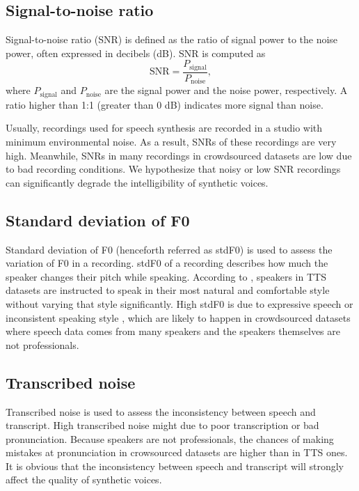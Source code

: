 \documentclass[12pt]{article}
\begin{document}
\subsection{Signal-to-noise ratio}
Signal-to-noise ratio (SNR) is defined as the ratio of signal power to the noise power, often expressed in decibels (dB). SNR is computed as
\begin{equation}\label{exp_SNR}
    \text{SNR} = \frac{P_\text{signal}}{P_\text{noise}},
\end{equation}
where $P_{\textrm{signal}}$ and $P_{\textrm{noise}}$ are the signal power and the noise power, respectively. A ratio higher than 1:1 (greater than 0 dB) indicates more signal than noise.

Usually, recordings used for speech synthesis are recorded in a studio with minimum environmental noise. As a result, SNRs of these recordings are very high. Meanwhile, SNRs in many recordings in crowdsourced datasets are low due to bad recording conditions.
We hypothesize that noisy or low SNR recordings can significantly degrade the intelligibility of synthetic voices.

\subsection{Standard deviation of F0}
Standard deviation of F0 (henceforth referred as stdF0) is used to assess the variation of F0 in a recording. stdF0 of a recording describes how much the speaker changes their pitch while speaking. According to \cite{buildingCorpus}, speakers in TTS datasets are instructed to speak in their most natural and comfortable style without varying that style significantly. High stdF0 is due to expressive speech or inconsistent speaking style \cite{usingAudiobooks}, \cite{dataSelectionFoundCorpuses} which are likely to happen in crowdsourced datasets where speech data comes from many speakers and the speakers themselves are not professionals.

\subsection{Transcribed noise}
Transcribed noise is used to assess the inconsistency between speech and transcript. High transcribed noise might due to poor transcription or bad pronunciation. Because speakers are not professionals, the chances of making mistakes at pronunciation in crowsourced datasets are higher than in TTS ones. It is obvious that the inconsistency between speech and transcript will strongly affect the quality of synthetic voices.
\end{document}

